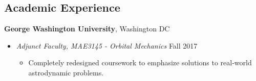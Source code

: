 
\subsection*{Academic Experience}
{}

\textbf{George Washington University}, Washington DC
    \begin{itemize}
        \item[] \textit{Adjunct Faculty, MAE3145 - Orbital Mechanics} \hfill {Fall 2017}
            \begin{itemize}
                \item Completely redesigned coursework to emphasize solutions to real-world astrodynamic problems.
                    

\end{itemize}
\end{itemize}
